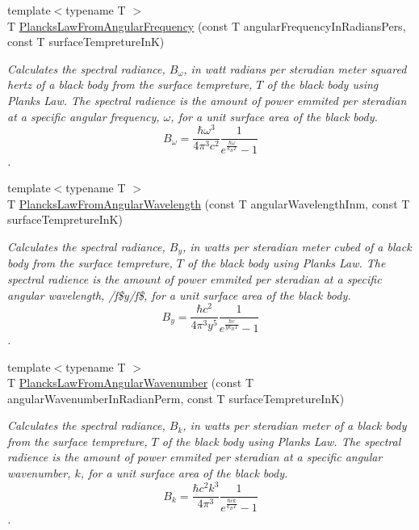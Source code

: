 \begin{DoxyCompactItemize}
{\footnotesize template$<$typename T $>$ }\\T \mbox{\hyperlink{group___e_g_x_phys-_electrodynamics-_black_body-_plancks_law_gaac540560c71e30c02b91d22e417b5863}{Plancks\+Law\+From\+Angular\+Frequency}} (const T angular\+Frequency\+In\+Radians\+Pers, const T surface\+Tempreture\+InK)
\begin{DoxyCompactList}\small\item\em Calculates the spectral radiance, $B_{\omega}$, in watt radians per steradian meter squared hertz of a black body from the surface tempreture, $T$ of the black body using Plank\textquotesingle{}s Law. The spectral radience is the amount of power emmited per steradian at a specific angular frequency, $\omega$, for a unit surface area of the black body. \[ B_{\omega} = \dfrac{\hbar \omega^3}{4\pi^3c^2} \dfrac{1}{e^{\frac{\hbar\omega}{k_B T}} - 1} \]. \end{DoxyCompactList}\item 
{\footnotesize template$<$typename T $>$ }\\T \mbox{\hyperlink{group___e_g_x_phys-_electrodynamics-_black_body-_plancks_law_ga7322124727f968d28807e918c5eeb23f}{Plancks\+Law\+From\+Angular\+Wavelength}} (const T angular\+Wavelength\+Inm, const T surface\+Tempreture\+InK)
\begin{DoxyCompactList}\small\item\em Calculates the spectral radiance, $B_{y}$, in watts per steradian meter cubed of a black body from the surface tempreture, $T$ of the black body using Plank\textquotesingle{}s Law. The spectral radience is the amount of power emmited per steradian at a specific angular wavelength, /f\$y/f\$, for a unit surface area of the black body. \[ B_{y} = \dfrac{\hbar c^2}{4\pi^3y^5} \dfrac{1}{e^{\frac{\hbar c}{y k_B T}} - 1} \]. \end{DoxyCompactList}\item 
{\footnotesize template$<$typename T $>$ }\\T \mbox{\hyperlink{group___e_g_x_phys-_electrodynamics-_black_body-_plancks_law_gaa3d3e0fdb77d25bdd40523f9975de902}{Plancks\+Law\+From\+Angular\+Wavenumber}} (const T angular\+Wavenumber\+In\+Radian\+Perm, const T surface\+Tempreture\+InK)
\begin{DoxyCompactList}\small\item\em Calculates the spectral radiance, $B_{k}$, in watts per steradian meter of a black body from the surface tempreture, $T$ of the black body using Plank\textquotesingle{}s Law. The spectral radience is the amount of power emmited per steradian at a specific angular wavenumber, $k$, for a unit surface area of the black body. \[ B_{k} = \dfrac{\hbar c^2 k^3}{4\pi^3} \dfrac{1}{e^{\frac{\hbar c k}{k_B T}} - 1} \]. \end{DoxyCompactList}\item 

\end{DoxyCompactItemize}
